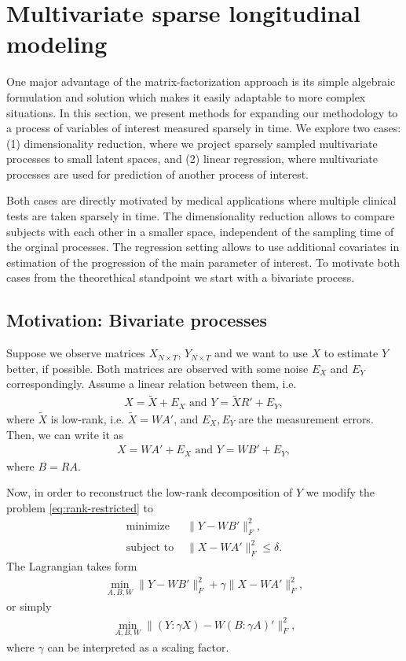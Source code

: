 \documentclass[preprint]{imsart}
\numberwithin{equation}{section}
\theoremstyle{plain}
\begin{document}
\section{Multivariate sparse longitudinal modeling}\label{s:multivariate}

One major advantage of the matrix-factorization approach is its simple algebraic formulation and solution which makes it easily adaptable to more complex situations. In this section, we present methods for expanding our methodology to a process of variables of interest measured sparsely in time. We explore two cases: (1) dimensionality reduction, where we project sparsely sampled multivariate processes to small latent spaces, and (2) linear regression, where multivariate processes are used for prediction of another process of interest.

Both cases are directly motivated by medical applications where multiple clinical tests are taken sparsely in time. The dimensionality reduction allows to compare subjects with each other in a smaller space, independent of the sampling time of the orginal processes. The regression setting allows to use additional covariates in estimation of the progression of the main parameter of interest. To motivate both cases from the theorethical standpoint we start with a bivariate process.

\subsection{Motivation: Bivariate processes}
Suppose we observe matrices $X_{N\times T}$, $Y_{N\times T}$ and we want to use $X$ to estimate $Y$ better, if possible. Both matrices are observed with some noise $E_X$ and $E_Y$ correspondingly. Assume a linear relation between them, i.e. 
\begin{align*}
X = \tilde{X} + E_X \text{ \ and \ } Y = \tilde{X}R' + E_{Y},
\end{align*}
where $\tilde{X}$ is low-rank, i.e. $\tilde{X} = WA'$, and $E_X,E_Y$ are the measurement errors. Then, we can write it as
\begin{align*}
X = WA' + E_X \text{ \ and \ } Y = WB' + E_{Y},
\end{align*}
where $B = RA$.

Now, in order to reconstruct the low-rank decomposition of $Y$ we modify the problem \eqref{eq:rank-restricted} to
\begin{align}
\text{minimize\ \ } & \| Y - WB' \|_F^2,  \nonumber\\
\text{subject to\ \ } & \| X - WA' \|_F^2 \leq \delta.
\end{align}
The Lagrangian takes form 
\begin{align*}
\min_{A,B,W} \| Y - WB' \|_F^2  + \gamma\| X - WA' \|_F^2,
\end{align*}
or simply
\begin{align*}
\min_{A,B,W} \| (Y: \gamma X) - W(B: \gamma A)' \|_F^2,
\end{align*}
where $\gamma$ can be interpreted as a scaling factor.
\end{document}
